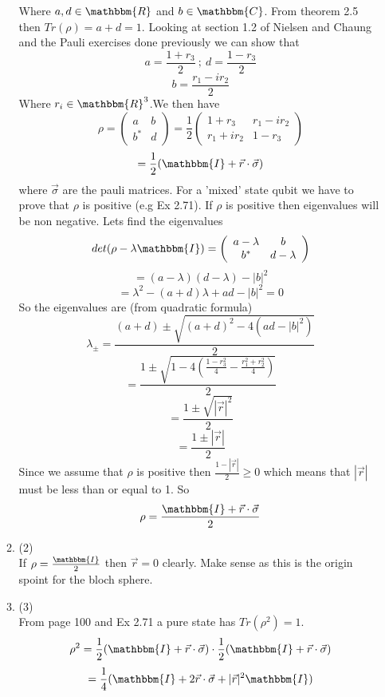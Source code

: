 \documentclass[12pt]{article}
\begin{document}
\begin{enumerate}
\begin{enumerate}
Where $a,d \in \mathbbm{R}$ and $b \in \mathbbm{C}$. From theorem 2.5 then $Tr(\rho) = a + d = 1$. Looking at section 1.2 of Nielsen and Chaung and the Pauli exercises done previously we can show that 
$$ a = \frac{1+r_3}{2} \ ; \ d = \frac{1 -r_3}{2} $$
$$ b = \frac{r_1 - ir_2}{2}$$
Where $r_i \in \mathbbm{R}^3$.We then have 
$$ \rho =  \left(\begin{array}{cc} a & b \\ b^* & d\end{array}\right) = \frac{1}{2}  \left(\begin{array}{cc} 1+r_3& r_1 - ir_2 \\ r_1 + ir_2 & 1-r_3 \end{array}\right) $$
$$ = \frac{1}{2} (\mathbbm{I} + \vec{r}\cdot \vec{\sigma}) $$
where $\vec{\sigma}$ are the pauli matrices. For a 'mixed' state qubit we have to prove that $\rho$ is positive (e.g Ex 2.71). If $\rho$ is positive then eigenvalues will be non negative. Lets find the eigenvalues 
$$ det(\rho - \lambda \mathbbm{I}) =  \left(\begin{array}{cc} a-\lambda & b \\ b^* & d-\lambda\end{array}\right)$$
$$ = (a-\lambda)(d-\lambda) - |b|^2 $$ 
$$ = \lambda^2 - (a+d)\lambda + ad - |b|^2 =0 $$ 
So the eigenvalues are (from quadratic formula) 
$$ \lambda_{\pm} = \frac{(a+d) \pm \sqrt{(a+d)^2 - 4(ad-|b|^2)}}{2} $$
$$ = \frac{1 \pm \sqrt{1-4(\frac{1-r_{3}^2}{4}-\frac{r_1^2 + r_2^2}{4})}}{2} $$
$$ =\frac{1 \pm \sqrt{|\vec{r}|^2}}{2}$$
$$ =\frac{1 \pm |\vec{r}| }{2} $$
Since we assume that $\rho$ is positive then $\frac{1-|\vec{r}|}{2} \geq 0 $ which means that $|\vec{r}|$ must be less than or equal to 1. So 
$$ \rho = \frac{\mathbbm{I} + \vec{r} \cdot \vec{\sigma}}{2} $$
\item (2) \\
If $\rho = \frac{\mathbbm{I}}{2} $ then $\vec{r} = 0$ clearly. Make sense as this is the origin spoint for the bloch sphere. 
\item (3) \\
From page 100 and Ex 2.71  a pure state has $Tr(\rho^2) = 1$. 
$$ \rho^2 = \frac{1}{2} (\mathbbm{I} + \vec{r} \cdot \vec{\sigma}) \cdot \frac{1}{2} (\mathbbm{I} + \vec{r} \cdot \vec{\sigma}) $$
$$ = \frac{1}{4} ( \mathbbm{I} + 2 \vec{r} \cdot \vec{\sigma} + |\vec{r}|^2 \mathbbm{I}) $$

\end{enumerate}
\end{enumerate}
\end{document}
